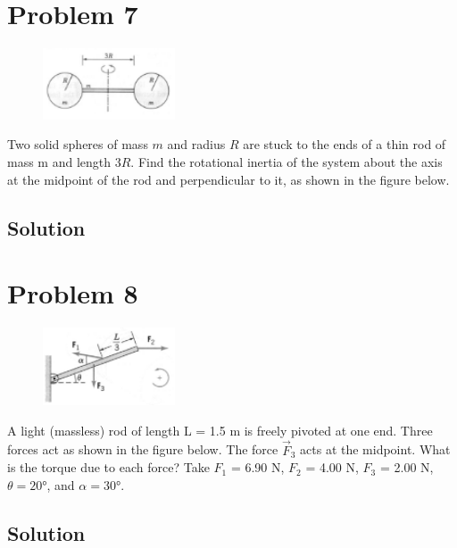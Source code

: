 \documentclass[12pt]{article}
\begin{document}
\pagebreak
\section*{Problem 7}
\begin{figure}
    \vspace{-30pt}
    \includegraphics[width=0.35\textwidth]{graph_7.png} 
\end{figure}
Two solid spheres of mass $m$ and radius $R$ are stuck to the ends of a thin rod of mass m and
length $3R$. Find the rotational inertia of the system about the axis at the midpoint of the rod and
perpendicular to it, as shown in the figure below.

\subsection*{Solution}


\pagebreak
\section*{Problem 8}
\begin{figure}
    \vspace{-30pt}
    \includegraphics[width=0.35\textwidth]{graph_8.png} 
\end{figure}
A light (massless) rod of length L = 1.5 m is freely pivoted at one end. Three forces act as
shown in the figure below. The force $\vec{F}_3$ acts at the midpoint. What is the torque due to each force?
Take $F_1$ = 6.90 N, $F_2$ = 4.00 N, $F_3$ = 2.00 N, $\theta = 20\unit{\degree}$, and $\alpha = 30\unit{\degree}$.

\subsection*{Solution}
 
\end{document}
